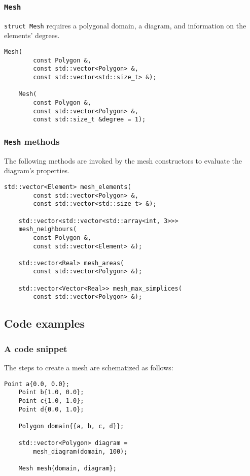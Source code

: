 \begin{frame}[fragile]
    \frametitle{\lstinline{Mesh}}

    \lstinline{struct Mesh} requires a polygonal domain, a diagram, and information on the elements' degrees.

    \begin{lstlisting}[style=cpp]
    Mesh(
        const Polygon &, 
        const std::vector<Polygon> &, 
        const std::vector<std::size_t> &);

    Mesh(
        const Polygon &, 
        const std::vector<Polygon> &, 
        const std::size_t &degree = 1);
    \end{lstlisting}

\end{frame}

\begin{frame}[fragile]
    \frametitle{\lstinline{Mesh} methods}

    The following methods are invoked by the mesh constructors to evaluate the diagram's properties.

    \begin{lstlisting}[style=cpp]
    std::vector<Element> mesh_elements(
        const std::vector<Polygon> &, 
        const std::vector<std::size_t> &);

    std::vector<std::vector<std::array<int, 3>>> 
    mesh_neighbours(
        const Polygon &, 
        const std::vector<Element> &);

    std::vector<Real> mesh_areas(
        const std::vector<Polygon> &);

    std::vector<Vector<Real>> mesh_max_simplices(
        const std::vector<Polygon> &);
    \end{lstlisting}

\end{frame}

\subsection{Code examples}

\begin{frame}[fragile]
    \frametitle{A code snippet}

    The steps to create a mesh are schematized as follows:

    \begin{lstlisting}[style=cpp]
    Point a{0.0, 0.0};
    Point b{1.0, 0.0};
    Point c{1.0, 1.0};
    Point d{0.0, 1.0};

    Polygon domain{{a, b, c, d}};

    std::vector<Polygon> diagram = 
        mesh_diagram(domain, 100);
    
    Mesh mesh{domain, diagram};
    \end{lstlisting}

\end{frame}

